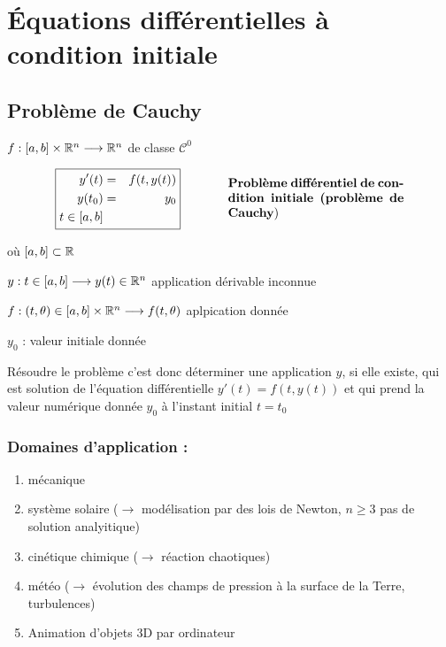 \chapter{Équations différentielles à condition initiale}

\section{Problème de Cauchy}

$f : [a,b] \times \mathbb{R}^n \longrightarrow \mathbb{R}^n$ de classe $\mathcal{C}^0$

\begin{equation*}
    \begin{array}{cc}
        \boxed{\begin{aligned}
            y'(t)  & = & f(t,y(t)) \\
            y(t_0) & = & y_0 \\
            t \in [a,b]
        \end{aligned}}
        & \hspace{1cm}
        \parbox{5cm}{\textbf{Problème différentiel de condition initiale (problème de Cauchy})}
    \end{array}
\end{equation*}

où $[a,b] \subset \mathbb{R}$

\hspace{0.5cm} $y : t \in [a,b] \longrightarrow y(t) \in \mathbb{R}^n$ application dérivable inconnue

\hspace{0.5cm} $f : (t, \theta) \in [a,b] \times \mathbb{R}^n \longrightarrow f(t,\theta)$ aplpication donnée

\hspace{0.5cm} $y_0$ : valeur initiale donnée


Résoudre le problème c'est donc déterminer une application $y$, si elle existe, qui est solution de 
l'équation différentielle $y'(t) = f(t,y(t))$ et qui prend la valeur numérique donnée 
$y_0$ à l'instant initial $t=t_0$

\subsection*{Domaines d'application :}
\begin{enumerate}[label=-]
    \item mécanique
    \item système solaire ($\to$ modélisation par des lois de Newton, $n \geq 3$ pas de solution analyitique)
    \item cinétique chimique ($\to$ réaction chaotiques)
    \item météo ($\to$ évolution des champs de pression à la surface de la Terre, turbulences)
    \item Animation d'objets 3D par ordinateur
\end{enumerate}

